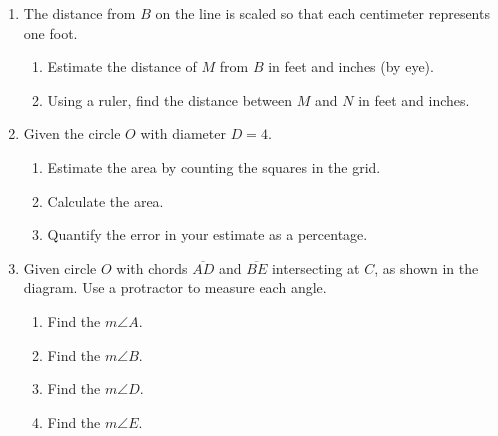 \documentclass[12pt, twoside]{article}
\begin{document}
\begin{enumerate}
  \item The distance from $B$ on the line is scaled so that each centimeter represents one foot. \\[15pt] %
  \begin{enumerate}
    \item Estimate the distance of $M$ from $B$ in feet and inches (by eye). \vspace{1cm} 
    \item Using a ruler, find the distance between $M$ and $N$ in feet and inches. 
  \end{enumerate} \vspace{2cm}

  \item Given the circle $O$ with diameter $D=4$.
  \begin{multicols}{2}
    \begin{enumerate}[itemsep=1.5cm]
      \item Estimate the area by counting the squares in the grid.
      \item Calculate the area. 
      \item Quantify the error in your estimate as a percentage.
    \end{enumerate}
  \end{multicols}


\newpage
  \item Given circle $O$ with chords $\overline{AD}$ and $\overline{BE}$ intersecting at $C$, as shown in the diagram. Use a protractor to measure each angle.
    \begin{multicols}{2}
    \raggedcolumns
    \begin{enumerate}[itemsep=1cm]
      \item Find the $m\angle A$.
      \item Find the $m\angle B$.
      \item Find the $m\angle D$.
      \item Find the $m\angle E$.
      

\end{enumerate}
\end{multicols}
\end{enumerate}
\end{document}
